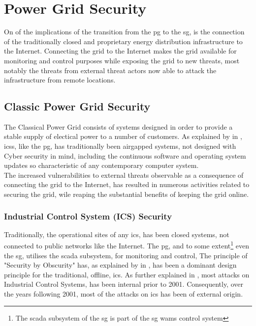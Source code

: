 \chapter{Power Grid  Security}


On of the implications of the transition from the \acrlong{pg} to the \acrlong{sg}, is the connection of  the traditionally closed and  proprietary energy distribution infrastructure to the Internet. 
Connecting the grid to the Internet  makes the grid available for monitoring and control purposes while exposing the grid to new threats, most notably the threats from external threat actors now able to attack the infrastructure from remote locations. 




\section{Classic Power Grid Security}

The Classical Power Grid consists of systems designed in order to provide a stable supply of electical power to a number of customers. As explained by \citeauthor{knapp2015industrial} in \cite{knapp2015industrial}, \acrshort{ics}s, like the \acrlong{pg}, has traditionally been airgapped systems, not designed with Cyber security in mind, including the continuous software and operating system updates so characteristic of any contemporary computer system. \\

The increased vulnerabilities to external threats observable as a consequence of connecting the grid to the Internet, has resulted in numerous activities related to securing the grid, wile reaping the substantial benefits of keeping the grid online. 



\subsection{Industrial Control System (ICS) Security}


Traditionally, the operational sites of any \acrfull{ics},  has been closed systems, not connected to public networks like the Internet. The \acrshort{pg}, and to some extent\footnote{The \acrshort{scada} subsystem of the \acrlong{sg} is part of the \acrshort{sg} \acrshort{wams} control system} even the \acrshort{sg}, utilises the \acrshort{scada} subsystem, for monitoring and control, 
The principle of "Security by Obscurity" has, as explained by  \citeauthor{humayed2017cyber}  in \cite{humayed2017cyber}, has been a dominant design principle for the traditional, offline, \acrlong{ics}.
As further explained  in \cite{humayed2017cyber}, most attacks on Industrial Control Systems, has been internal prior to 2001. Consequently, over the years following 2001, most of the attacks on \acrshort{ics} has been of external origin.





